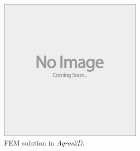 \documentclass{jfm}
\begin{document}
\begin{figure}
  \centerline{\includegraphics[height=7cm,width=7cm]{e88_1_thumb.jpg}}
  \caption{FEM solution in \emph{Agros2D}.}
\label{fig:FEM_DEP}
\end{figure}




\appendix
\end{document}
